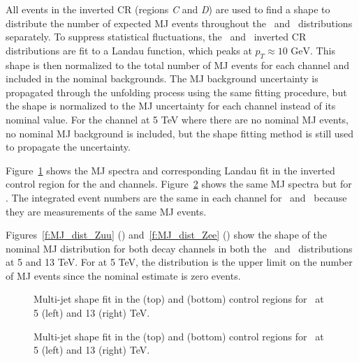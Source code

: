 All events in the inverted CR (regions \textit{C} and \textit{D}) are used to find a shape to distribute the number of expected MJ events throughout the \ptdilep\ and \ut\ distributions separately. To suppress statistical fluctuations, the \ptdilep\ and \ut\ inverted CR distributions are fit to a Landau function, which peaks at $p_{T} \approx 10 \textrm{ GeV}$. This shape is then normalized to the total number of MJ events for each channel and included in the nominal backgrounds. The MJ background uncertainty is propagated through the unfolding process using the same fitting procedure, but the shape is normalized to the MJ uncertainty for each channel instead of its nominal value. For the \Zee channel at 5 TeV where there are no nominal MJ events, no nominal MJ background is included, but the shape fitting method is still used to propagate the uncertainty.

Figure~\ref{f:MJshape_fit_pT} shows the MJ \ptdilep spectra and corresponding Landau fit in the inverted control region for the \Zmm and \Zee channels. Figure~\ref{f:MJshape_fit_uT} shows the same MJ spectra but for \ut . The integrated event numbers are the same in each channel for \ptdilep\ and \ut\ because they are measurements of the same MJ events.

Figures~\ref{f:MJ_dist_Zuu} (\Zmm) and~\ref{f:MJ_dist_Zee} (\Zee) show the shape of the nominal MJ distribution for both \Zboson decay channels in both the \ptdilep\ and \ut\ distributions at 5 and 13 TeV. For \Zee at 5 TeV, the distribution is the upper limit on the number of MJ events since the nominal estimate is zero events.

\begin{figure}[h]
\centering
{}

\caption{Multi-jet shape fit in the \Zmm (top) and \Zee (bottom) control regions for \ptdilep\ at 5 (left) and 13 (right) TeV.}
\label{f:MJshape_fit_pT}
\end{figure}

\begin{figure}[h]
\centering
{}

\caption{Multi-jet shape fit in the \Zmm (top) and \Zee (bottom) control regions for \ut\ at 5 (left) and 13 (right) TeV.}
\label{f:MJshape_fit_uT}
\end{figure}

